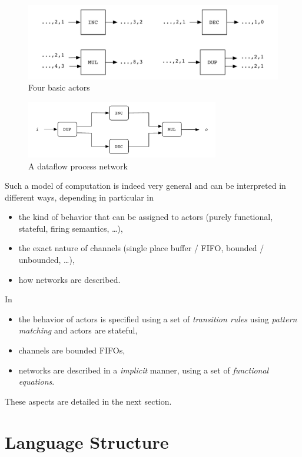 \begin{figure}[h]
  \centering
  \includegraphics[width=1.0\textwidth]{figs/fouractors}
  \caption{Four basic actors}
  \label{fig:fouractors}
\end{figure}

\begin{figure}[h]
  \centering
  \includegraphics[width=0.75\textwidth]{figs/networkfour}
  \caption{A dataflow process network}
  \label{fig:networkfour}
\end{figure}

\medskip
Such a model of computation is indeed very general and can be interpreted in different ways, 
depending in particular in 
\begin{itemize}
\item the kind of behavior that can be assigned to actors (purely functional, stateful, firing
  semantics, \ldots),
\item the exact nature of channels (single place buffer / FIFO, bounded / unbounded, \ldots),
\item how networks are described.
\end{itemize}

In \caph
\begin{itemize}
\item the behavior of actors is specified using a set of \emph{transition rules} using \emph{pattern
    matching} and
  actors are stateful,
\item channels are bounded FIFOs,
\item networks are described in a \emph{implicit} manner, using a set of \emph{functional
    equations}.
\end{itemize}
These aspects are detailed in the next section.

\section{Language Structure}
\label{sec:language-structure}

